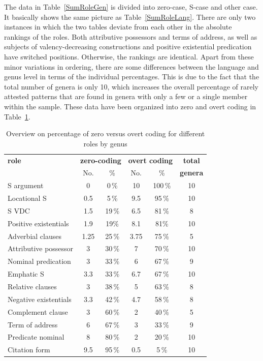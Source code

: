 The data in Table~\ref{SumRoleGen} is divided into zero-case, S-case and other case. 
It basically shows the same picture as Table~\ref{SumRoleLang}. 
There are only two instances in which the two tables deviate from each other in the absolute rankings of the roles. 
Both attributive possessors and terms of address, as well as subjects of valency-decreasing constructions and positive existential predication have switched positions.
Otherwise, the rankings are identical.
Apart from these minor variations in ordering, there are some differences between the language and genus level in terms of the individual percentages. 
This is due to the fact that the total number of genera is only 10, which increases the overall percentage of rarely attested patterns that are found in genera with only a few or a single member within the sample. 
These data have been organized into zero and overt coding in Table~\ref{SumRoleGenOvert}.

\begin{table}[t,b,h]
\centering
{
\begin{tabular}{lccccc}
\hline \hline
\bfseries role &\multicolumn{2}{c}{\bfseries zero-coding} &\multicolumn{2}{c}{\bfseries overt coding} &\bfseries total \\
{}& No.& \% &No. & \% & \bfseries genera \\
\hline
S argument &0  &0\,\% &10  &100\,\%  & 10\\
Locational S &0.5  &5\,\% &9.5  &95\,\% &10\\
S VDC&1.5  &19\,\% &6.5  &81\,\% &8\\
Positive existentials&1.9  &19\% &8.1  &81\% &10\\
Adverbial clauses&1.25  &25\,\% &3.75  &75\,\% &5\\
Attributive possessor&3  &30\,\% &7  &70\,\% &10\\
Nominal predication&3  &33\,\% &6  &67\,\% &9\\
Emphatic S&3.3  &33\,\% &6.7  &67\,\% &10\\
Relative clauses&3  &38\,\% &5  &63\,\% &8\\
Negative existentials&3.3  &42\,\% &4.7  &58\,\% &8\\
Complement clause&3  &60\,\% &2  &40\,\% &5\\
Term of address&6  &67\,\% &3  &33\,\% &9\\
Predicate nominal&8  &80\,\% &2  &20\,\% &10\\
Citation form&9.5  &95\,\% &0.5  &5\,\% &10\\
\hline \hline
\end{tabular}
}
\caption{Overview on percentage of zero versus overt coding for different roles by genus}\label{SumRoleGenOvert}
\end{table}

